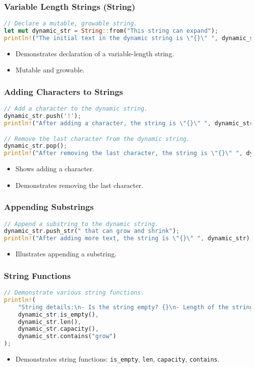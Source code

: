 \documentclass[aspectratio=169, table]{beamer}
\begin{document}
\begin{frame}[fragile]
\frametitle{Variable Length Strings (String)}
\begin{lstlisting}[language=Rust]
// Declare a mutable, growable string.
let mut dynamic_str = String::from("This string can expand");
println!("The initial text in the dynamic string is \"{}\" ", dynamic_str);
\end{lstlisting}
\begin{itemize}
\item Demonstrates declaration of a variable-length string.
\item Mutable and growable.
\end{itemize}
\end{frame}

\begin{frame}[fragile]
\frametitle{Adding Characters to Strings}
\begin{lstlisting}[language=Rust]
// Add a character to the dynamic string.
dynamic_str.push('!');
println!("After adding a character, the string is \"{}\" ", dynamic_str);

// Remove the last character from the dynamic string.
dynamic_str.pop();
println!("After removing the last character, the string is \"{}\" ", dynamic_str);
\end{lstlisting}
\begin{itemize}
\item Shows adding a character.
\item Demonstrates removing the last character.
\end{itemize}
\end{frame}

\begin{frame}[fragile]
\frametitle{Appending Substrings}
\begin{lstlisting}[language=Rust]
// Append a substring to the dynamic string.
dynamic_str.push_str(" that can grow and shrink");
println!("After adding more text, the string is \"{}\" ", dynamic_str);
\end{lstlisting}
\begin{itemize}
\item Illustrates appending a substring.
\end{itemize}
\end{frame}

\begin{frame}[fragile]
\frametitle{String Functions}
\begin{lstlisting}[language=Rust]
// Demonstrate various string functions.
println!(
	"String details:\n- Is the string empty? {}\n- Length of the string: {}\n- String capacity: {}\n- Does the string contain 'grow'? {}",
	dynamic_str.is_empty(),
	dynamic_str.len(),
	dynamic_str.capacity(),
	dynamic_str.contains("grow")
);
\end{lstlisting}
\begin{itemize}
	\item Demonstrates string functions: \texttt{is\_empty}, \texttt{len}, \texttt{capacity}, \texttt{contains}.
\end{itemize}
\end{frame}
\end{document}
